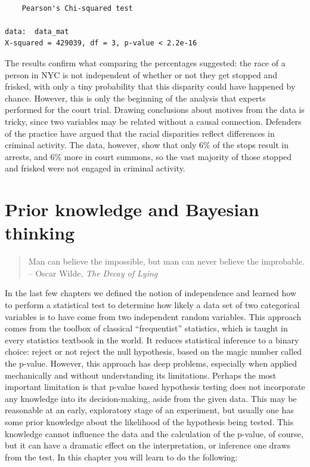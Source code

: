 \documentclass[
  letterpaper,
  DIV=11,
  numbers=noendperiod]{scrreprt}
\begin{document}
\begin{verbatim}

    Pearson's Chi-squared test

data:  data_mat
X-squared = 429039, df = 3, p-value < 2.2e-16
\end{verbatim}

The results confirm what comparing the percentages suggested: the race
of a person in NYC is not independent of whether or not they get stopped
and frisked, with only a tiny probability that this disparity could have
happened by chance. However, this is only the beginning of the analysis
that experts performed for the court trial. Drawing conclusions about
motives from the data is tricky, since two variables may be related
without a causal connection. Defenders of the practice have argued that
the racial disparities reflect differences in criminal activity. The
data, however, show that only 6\% of the stops result in arrests, and
6\% more in court summons, so the vast majority of those stopped and
frisked were not engaged in criminal activity.


\hypertarget{prior-knowledge-and-bayesian-thinking}{%
\chapter{Prior knowledge and Bayesian
thinking}\label{prior-knowledge-and-bayesian-thinking}}

\begin{quote}
Man can believe the impossible, but man can never believe the
improbable.\\
-- Oscar Wilde, \emph{The Decay of Lying}
\end{quote}

In the last few chapters we defined the notion of independence and
learned how to perform a statistical test to determine how likely a data
set of two categorical variables is to have come from two independent
random variables. This approach comes from the toolbox of classical
``frequentist'' statistics, which is taught in every statistics textbook
in the world. It reduces statistical inference to a binary choice:
reject or not reject the null hypothesis, based on the magic number
called the p-value. However, this approach has deep problems, especially
when applied mechanically and without understanding its limitations.
Perhaps the most important limitation is that p-value based hypothesis
testing does not incorporate any knowledge into its decision-making,
aside from the given data. This may be reasonable at an early,
exploratory stage of an experiment, but usually one has some prior
knowledge about the likelihood of the hypothesis being tested. This
knowledge cannot influence the data and the calculation of the p-value,
of course, but it can have a dramatic effect on the interpretation, or
inference one draws from the test. In this chapter you will learn to do
the following:
\end{document}
